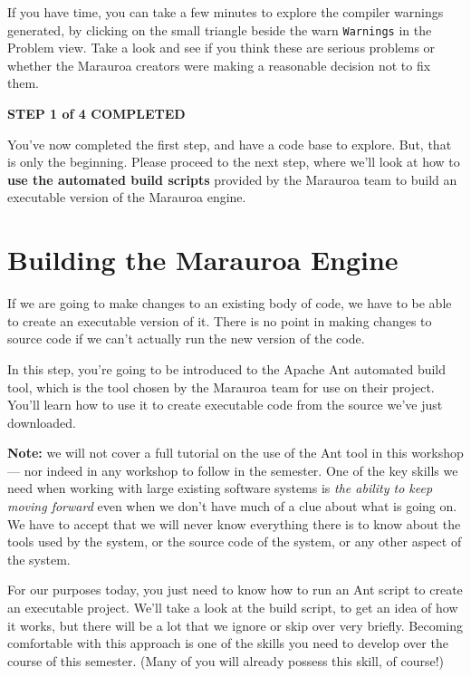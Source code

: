\documentclass[
]{book}
\begin{document}
If you have time, you can take a few minutes to explore the compiler warnings generated, by clicking on the small triangle beside the warn \texttt{Warnings} in the Problem view. Take a look and see if you think these are serious problems or whether the Marauroa creators were making a reasonable decision not to fix them.

\textbf{STEP 1 of 4 COMPLETED}

You've now completed the first step, and have a code base to explore. But, that is only the beginning. Please proceed to the next step, where we'll look at how to \textbf{use the automated build scripts} provided by the Marauroa team to build an executable version of the Marauroa engine.

\hypertarget{building-the-marauroa-engine}{%
\section{Building the Marauroa Engine}\label{building-the-marauroa-engine}}

If we are going to make changes to an existing body of code, we have to be able to create an executable version of it. There is no point in making changes to source code if we can't actually run the new version of the code.

In this step, you're going to be introduced to the Apache Ant automated build tool, which is the tool chosen by the Marauroa team for use on their project. You'll learn how to use it to create executable code from the source we've just downloaded.

\textbf{Note:} we will not cover a full tutorial on the use of the Ant tool in this workshop --- nor indeed in any workshop to follow in the semester. One of the key skills we need when working with large existing software systems is \emph{the ability to keep moving forward} even when we don't have much of a clue about what is going on. We have to accept that we will never know everything there is to know about the tools used by the system, or the source code of the system, or any other aspect of the system.

For our purposes today, you just need to know how to run an Ant script to create an executable project. We'll take a look at the build script, to get an idea of how it works, but there will be a lot that we ignore or skip over very briefly. Becoming comfortable with this approach is one of the skills you need to develop over the course of this semester. (Many of you will already possess this skill, of course!)
\end{document}
